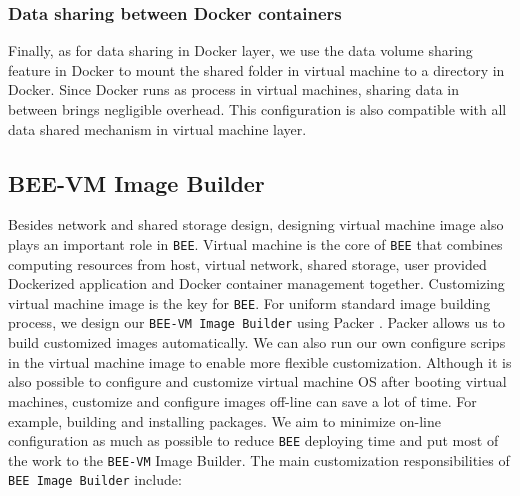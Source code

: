 \subsubsection{Data sharing between Docker containers}
Finally, as for data sharing in Docker layer, we use the data volume sharing feature in Docker to mount the shared folder in virtual machine to a directory in Docker. Since Docker runs as process in virtual machines, sharing data in between brings negligible overhead. This configuration is also compatible with all data shared mechanism in virtual machine layer.

\subsection{BEE-VM Image Builder}
Besides network and shared storage design, designing virtual machine image also plays an important role in \texttt{BEE}. Virtual machine is the core of \texttt{BEE} that combines computing resources from host, virtual network, shared storage, user provided Dockerized application and Docker container management together. Customizing virtual machine image is the key for \texttt{BEE}. For uniform standard image building process, we design our \texttt{BEE-VM Image Builder} using Packer \cite{packer}. Packer allows us to build customized images automatically. We can also run our own configure scrips in the virtual machine image to enable more flexible customization. Although it is also possible to configure and customize virtual machine OS after booting virtual machines, customize and configure images off-line can save a lot of time. For example, building and installing packages. We aim to minimize on-line configuration as much as possible to reduce \texttt{BEE} deploying time and put most of the work to the \texttt{BEE-VM} Image Builder. The main customization responsibilities of \texttt{BEE Image Builder} include:
